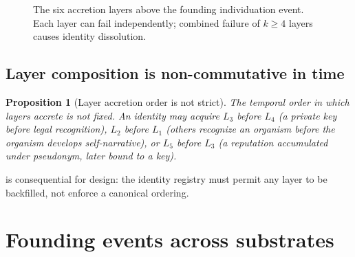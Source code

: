 \documentclass[11pt,a4paper,parskip=half-,DIV=12,headings=standardclasses]{scrartcl}
\theoremstyle{ncthm}
\newtheorem{proposition}[theorem]{Proposition}
\theoremstyle{ncdef}
\begin{document}
\begin{figure}[h]
\centering
{}
\caption{The six accretion layers above the founding individuation
event. Each layer can fail independently; combined failure of $k \geq
4$ layers causes identity dissolution.}
\label{fig:accretion}
\end{figure}

\subsection{Layer composition is non-commutative in time}

\begin{proposition}[Layer accretion order is not strict]\label{prop:layer-order}
The temporal order in which layers accrete is not fixed. An identity
may acquire $L_3$ before $L_4$ (a private key before legal
recognition), $L_2$ before $L_1$ (others recognize an organism before
the organism develops self-narrative), or $L_5$ before $L_3$ (a
reputation accumulated under pseudonym, later bound to a key).
\end{proposition}

 is consequential for design: the identity
registry must permit any layer to be backfilled, not enforce a
canonical ordering.

\section{Founding events across substrates}\label{sec:founding}
\end{document}
